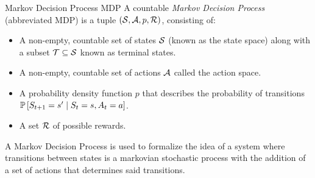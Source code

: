 \begin{dfn}{Markov Decision Process \cite[Lec.~2]{silver2015}}{MDP}
    A countable \emph{Markov Decision Process} (abbreviated MDP) is a tuple
    $(\mathcal{S}, \mathcal{A}, p, \mathcal{R})$, consisting of:
    \begin{itemize}
        \item A non-empty, countable set of states $\mathcal{S}$ (known as the state
            space) along with a subset $\mathcal{T} \subseteq \mathcal{S}$ known as
            terminal states. 
        \item A non-empty, countable set of actions $\mathcal{A}$ called the action
            space.
        \item A probability density function $p$ that describes the probability
            of transitions $\mathbb{P}\left[S_{t+1} = s' \mid S_t = s, A_t = a\right]$.
        \item A set $\mathcal{R}$ of possible rewards.
    \end{itemize}
\end{dfn}

A Markov Decision Process is used to formalize the idea of a system where
transitions between states is a markovian stochastic process with the addition
of a set of actions that determines said transitions. 